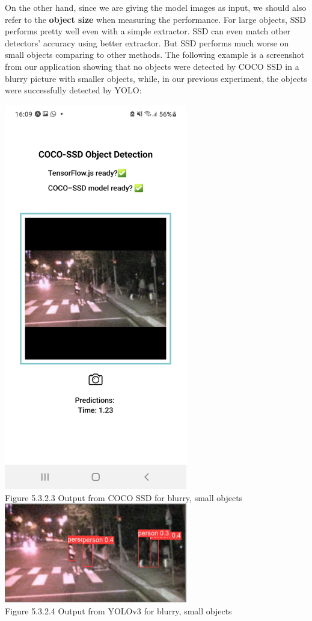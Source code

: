 \documentclass[runningheads,a4paper,11pt]{report}
\begin{document}
On the other hand, since we are giving the model images as input, we should also refer to the \textbf{object size} when measuring the performance. For large objects, SSD performs pretty well even with a simple extractor. SSD can even match other detectors' accuracy using better extractor. But SSD performs much worse on small objects comparing to other methods. The following example is a screenshot from our application showing that no objects were detected by COCO SSD in a blurry picture with smaller objects, while, in our previous experiment, the objects were successfully detected by YOLO:

\begin{center}
\includegraphics[width=8cm]{images/screenshot1.jpg}\\   
Figure 5.3.2.3 Output from COCO SSD for blurry, small objects
\break
\break
\includegraphics[width=8cm]{images/image4_label.PNG} \\
Figure 5.3.2.4 Output from YOLOv3 for blurry, small objects
\end{center}
\end{document}
